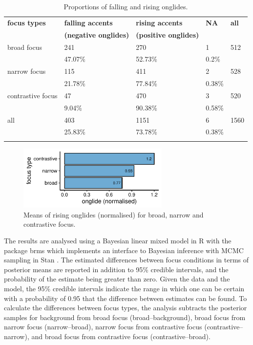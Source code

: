 \begin{table}
\caption{Proportions of falling and rising onglides.}
\begin{tabularx}{\textwidth}{Xllll}
	\lsptoprule
\textbf{focus types	} &	\textbf{falling accents}&		\textbf{rising accents} &			\textbf{NA} & 	\textbf{all}\\
&				\textbf{(negative onglides)} &	\textbf{(positive onglides)} &		&			\\	
\midrule
broad focus &		241 & 				270  & 					1 &			512 \\
&				47.07\% &				52.73\% &					0.2\% &		\\
\midrule
narrow focus &		115  &				411 & 					2  &			528 \\
&				21.78\% &				77.84\% & 					0.38\% &		\\
\midrule
contrastive focus &		47  &					470 &						3 &			520 \\
&				9.04\% &				90.38\% &					0.58\% &		\\
\midrule
all &				403 &					1151  &					6 &			1560 \\
&				25.83\% & 				73.78\% &					0.38\% & 		\\ \lspbottomrule
\end{tabularx}
\label{tab:props_onglide}
\end{table}%

\begin{figure}[htbp]
\begin{center}
\includegraphics[width=7.5cm]{figures/ch6/onglide_norm_rising_means.pdf}
\caption{Means of rising onglides (normalised) for broad, narrow and contrastive focus.}
\label{fig:onglide_means}
\end{center}
\end{figure}

The results are analysed using a Bayesian linear mixed model in R \citep{RCoreTeam2018} with the package brms \citep{Buerkner2018} which implements an interface to Bayesian inference with MCMC sampling in Stan \citep{Carpenteretal2017}. The estimated differences between focus conditions in terms of posterior means are reported in addition to 95\% credible intervals, and the probability of the estimate being greater than zero. Given the data and the model, the 95\% credible intervals indicate the range in which one can be certain with a probability of 0.95 that the difference between estimates can be found. To calculate the differences between focus types,  the analysis subtracts the posterior samples for background from broad focus (broad–background), broad focus from narrow focus (narrow–broad), narrow focus from contrastive focus (contrastive–narrow), and broad focus from contrastive focus (contrastive–broad).

